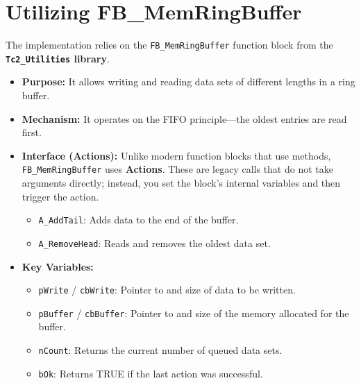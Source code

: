 \documentclass[11pt,a4paper]{article}
\begin{document}
\section{Utilizing FB\_MemRingBuffer}

The implementation relies on the \texttt{FB\_MemRingBuffer} function block from the \textbf{\texttt{Tc2\_Utilities} library}.

\begin{itemize}[leftmargin=*]
    \item \textbf{Purpose:} It allows writing and reading data sets of different lengths in a ring buffer.
    \item \textbf{Mechanism:} It operates on the FIFO principle---the oldest entries are read first.
    \item \textbf{Interface (Actions):} Unlike modern function blocks that use methods, \texttt{FB\_MemRingBuffer} uses \textbf{Actions}. These are legacy calls that do not take arguments directly; instead, you set the block's internal variables and then trigger the action.
    \begin{itemize}
        \item \texttt{A\_AddTail}: Adds data to the end of the buffer.
        \item \texttt{A\_RemoveHead}: Reads and removes the oldest data set.
    \end{itemize}
    \item \textbf{Key Variables:}
    \begin{itemize}
        \item \texttt{pWrite} / \texttt{cbWrite}: Pointer to and size of data to be written.
        \item \texttt{pBuffer} / \texttt{cbBuffer}: Pointer to and size of the memory allocated for the buffer.
        \item \texttt{nCount}: Returns the current number of queued data sets.
        \item \texttt{bOk}: Returns TRUE if the last action was successful.
    \end{itemize}
\end{itemize}
\end{document}
